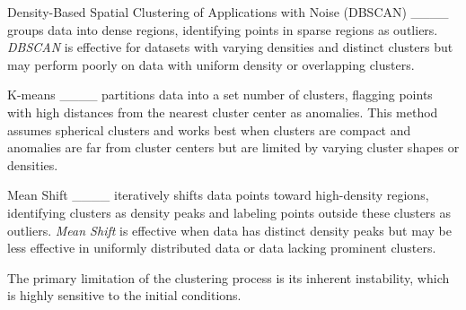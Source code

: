 Density-Based Spatial Clustering of Applications with Noise (DBSCAN) ____ groups data into dense regions, identifying points in sparse regions as outliers. \textit{DBSCAN} is effective for datasets with varying densities and distinct clusters but may perform poorly on data with uniform density or overlapping clusters.

K-means ____ partitions data into a set number of clusters, flagging points with high distances from the nearest cluster center as anomalies. This method assumes spherical clusters and works best when clusters are compact and anomalies are far from cluster centers but are limited by varying cluster shapes or densities.

Mean Shift ____ iteratively shifts data points toward high-density regions, identifying clusters as density peaks and labeling points outside these clusters as outliers. \textit{Mean Shift} is effective when data has distinct density peaks but may be less effective in uniformly distributed data or data lacking prominent clusters.

The primary limitation of the clustering process is its inherent instability, which is highly sensitive to the initial conditions.